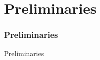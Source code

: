 \section{Preliminaries}

\begin{frame}
    \frametitle{Preliminaries}
    \begin{block}{Preliminaries}
    \end{block}
\end{frame}